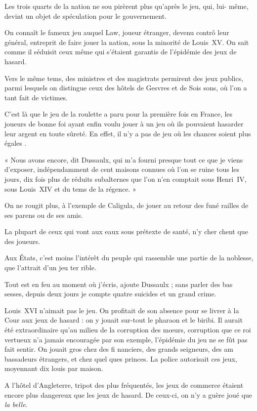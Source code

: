 Les trois quarts de la nation ne sou%
pirèrent plus qu'après le jeu, qui, lui-%
même, devint un objet de spéculation
pour le gouvernement.

On connaît le fameux jeu auquel
Law, joueur étranger, devenu contrô%
leur général, entreprit de faire jouer la
nation, sous la minorité de Louis~XV.
On sait comme il séduisit ceux même
qui s'étaient garantis de l'épidémie
des jeux de hasard.

Vers le même tems, des ministres
et des magistrats permirent des jeux
publics, parmi lesquels on distingue
ceux des hôtels de Gesvres et de Sois%
sons, où l'on a tant fait de victimes.

C'est là que le jeu de la roulette a
paru pour la première fois en France,
les joueurs de bonne foi ayant enfin
voulu jouer à un jeu où ils pouvaient
hasarder leur argent en toute sûreté.
En effet, il n'y a pas de jeu où les
chances soient plus égales .

« Nous avons encore, dit Dussaulx,
qui m'a fourni presque tout ce que je
viens d'exposer, indépendamment de
cent maisons connues où l'on se ruine
tous les jours, dix fois plus de réduits
subalternes que l'on n'en comptait
sous Henri~IV, sous Louis~XIV et du 
tems de la régence. »

On ne rougit plus, à l'exemple de
Caligula, de jouer au retour des funé%
railles de ses parens ou de ses amis.

La plupart de ceux qui vont aux
eaux sous prétexte de santé, n'y cher%
chent que des joueurs.

Aux États, c'est moins l'intérêt du
peuple qui rassemble une partie de la
noblesse, que l'attrait d'un jeu ter%
rible.

Tout est en feu au moment où j'écris,
ajoute Dussaulx ; sans parler des bas%
sesses, depuis deux jours je compte
quatre suicides et un grand crime.

Louis~XVI n'aimait pas le jeu. On
profitait de son absence pour se livrer
à la Cour aux jeux de hasard : on y
jouait sur-tout le pharaon et le biribi.
Il aurait été extraordinaire qu'au
milieu de la corruption des mœurs,
corruption que ce roi vertueux n'a
jamais encouragée par son exemple,
l'épidémie du jeu ne se fût pas fait
sentir. On jouait gros chez des fi%
nanciers, des grands seigneurs, des am%
bassadeurs étrangers, et chez quel%
ques princes. La police autorisait ces
jeux, moyennant dix louis par maison.

A l'hôtel d'Angleterre, tripot des
plus fréquentés, les jeux de commerce
étaient encore plus dangereux que les
jeux de hasard. De ceux-ci, on n'y a
guère joué que \emph{la belle}.

